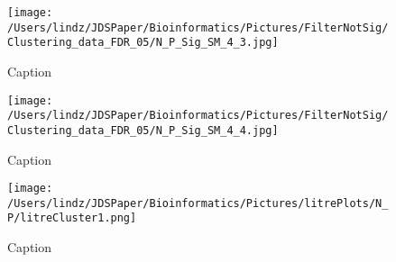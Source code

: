 \documentclass{article}
\begin{document}
\begin{figure}[!p]
\centerline{\texttt{[image: /Users/lindz/JDSPaper/Bioinformatics/Pictures/FilterNotSig/Clustering\_data\_FDR\_05/N\_P\_Sig\_SM\_4\_3.jpg]}}
\caption{Caption
\label{suppSMCluster3}}
\end{figure}  
  
\begin{figure}[!p]
\centerline{\texttt{[image: /Users/lindz/JDSPaper/Bioinformatics/Pictures/FilterNotSig/Clustering\_data\_FDR\_05/N\_P\_Sig\_SM\_4\_4.jpg]}}
\caption{Caption
\label{suppSMCluster4}}
\end{figure}  
  
\begin{figure}[!p]
\centerline{\texttt{[image: /Users/lindz/JDSPaper/Bioinformatics/Pictures/litrePlots/N\_P/litreCluster1.png]}}
\caption{Caption
\label{litreCluster1}}
\end{figure}   
\end{document}
